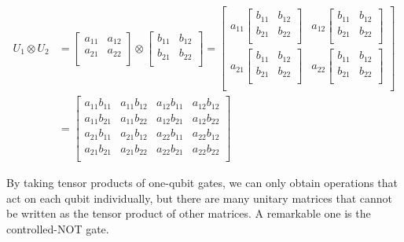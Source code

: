 \begin{align}
    U_1 \otimes U_2&=\begin{bmatrix}
        a_{11}&a_{12}\\
        a_{21}&a_{22}\\
        \end{bmatrix} 
    \otimes \begin{bmatrix}
        b_{11}&b_{12}\\
        b_{21}&b_{22}\\
        \end{bmatrix} 
    = \begin{bmatrix}
        a_{11} \begin{bmatrix}
        b_{11}&b_{12}\\
        b_{21}&b_{22}\\
        \end{bmatrix} &a_{12} \begin{bmatrix}
        b_{11}&b_{12}\\
        b_{21}&b_{22}\\
        \end{bmatrix} \\
        a_{21} \begin{bmatrix}
        b_{11}&b_{12}\\
        b_{21}&b_{22}\\
        \end{bmatrix} &a_{22} \begin{bmatrix}
        b_{11}&b_{12}\\
        b_{21}&b_{22}\\
        \end{bmatrix} \\
        \end{bmatrix} \\
    &= \begin{bmatrix}
        a_{11}b_{11}&a_{11}b_{12} &a_{12}b_{11}&a_{12}b_{12}\\
        a_{11}b_{21}&a_{11}b_{22}& a_{12}b_{21}&a_{12}b_{22}\\
        a_{21}b_{11}&a_{21}b_{12}& a_{22}b_{11}&a_{22}b_{12}\\
        a_{21}b_{21}&a_{21}b_{22}& a_{22}b_{21}&a_{22}b_{22}\\
        \end{bmatrix} 
\end{align}

By taking tensor products of one-qubit gates, we can only obtain operations that act on each qubit individually, but there are many unitary matrices that cannot be written as the tensor product of other matrices. A remarkable one is the controlled-NOT gate.

